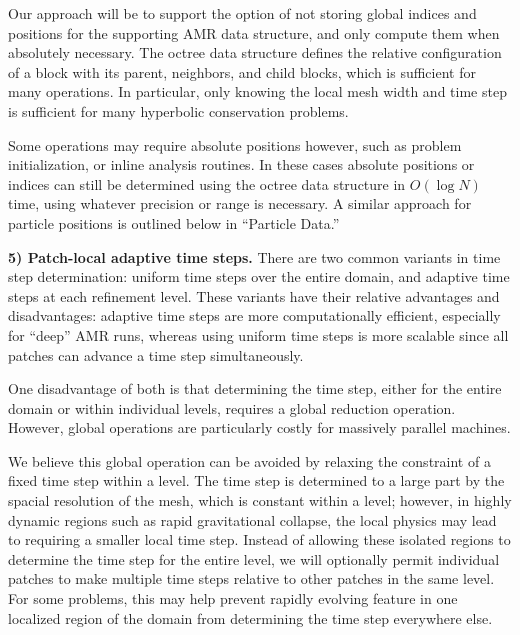 \documentclass[10pt,twocolumn]{article}
\begin{document}
Our approach will be to support the option of not storing global
indices and positions for the supporting AMR data structure, and only
compute them when absolutely necessary.  The octree data structure
defines the relative configuration of a block with its parent,
neighbors, and child blocks, which is sufficient for many operations.
In particular, only knowing the local mesh width and time step is
sufficient for many hyperbolic conservation problems.

Some operations may require absolute positions however, such as
problem initialization, or inline analysis routines.  In these cases
absolute positions or indices can still be determined using the octree
data structure in $O(\log N)$ time, using whatever precision or range
is necessary.  A similar approach for particle positions is outlined
below in ``Particle Data.''



\textbf{5) Patch-local adaptive time steps.} There are two common
variants in time step determination: uniform time steps over the
entire domain, and adaptive time steps at each refinement level.
These variants have their relative advantages and disadvantages:
adaptive time steps are more computationally efficient, especially for
``deep'' AMR runs, whereas using uniform time steps is more scalable
since all patches can advance a time step simultaneously.

One disadvantage of both is that determining the time step, either for
the entire domain or within individual levels, requires a global
reduction operation.  However, global operations are particularly
costly for massively parallel machines.

We believe this global operation can be avoided by relaxing the
constraint of a fixed time step within a level.  The time step is
determined to a large part by the spacial resolution of the mesh,
which is constant within a level; however, in highly dynamic regions
such as rapid gravitational collapse, the local physics may lead to
requiring a smaller local time step.  Instead of allowing these
isolated regions to determine the time step for the entire level, we
will optionally permit individual patches to make multiple time steps
relative to other patches in the same level.  For some problems, this
may help prevent rapidly evolving feature in one localized region of
the domain from determining the time step everywhere else.

\end{document}
